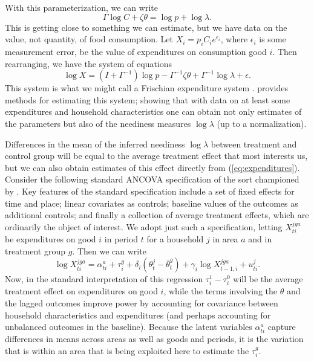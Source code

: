 \documentclass[12pt,letterpaper]{article}
\newcommand{\Eq}[1]{(\ref{eq:#1})}
\begin{document}
With this parameterization, we can write \[ \Gamma\log C + \zeta\theta
= \log p + \log\lambda.  \] This is getting close to something we can
estimate, but we have data on the value, not quantity, of food
consumption.  Let \(X_i=p_iC_ie^{\epsilon_i}\), where \(\epsilon_i\) is
some measurement error, be the value of expenditures on consumption
good \(i\).  Then rearranging, we have the system of equations
\begin{equation}
\label{eq:expenditures}
\log X  = (I + \Gamma^{-1})\log p - \Gamma^{-1}\zeta\theta + \Gamma^{-1}\log\lambda
+ \epsilon.
\end{equation}
This system is what we might call a Frischian expenditure system
\citep{browning-etal85}.  \cite{Ligon15} provides methods for
estimating this system; showing that with data on at least some
expenditures and household characteristics one can obtain not only
estimates of the parameters but also of the neediness measures
\(\log\lambda\) (up to a normalization).

Differences in the mean of the inferred neediness \(\log\lambda\) between
treatment and control group will be equal to the average treatment
effect that most interests us, but we can also obtain estimates of
this effect directly from \Eq{expenditures}.  Consider the following
standard ANCOVA specification of the sort championed by
\cite{Mckenzie2012}.  Key features of the standard specification
include a set of fixed effects for time and place; linear covariates
as controls; baseline values of the outcomes as additional controls;
and finally a collection of average treatment effects, which are
ordinarily the object of interest.  We adopt just such a
specification, letting \(X^{jga}_{ti}\) be expenditures on good \(i\) in
period \(t\) for a household \(j\) in area \(a\) and in treatment group \(g\).
Then we can write
\begin{equation}
\label{eq:ancova}
  \log X^{jga}_{ti} = \alpha^a_{ti} + \tau^g_i +  \delta_i(\theta^j_t - \bar\theta^g_t) + \gamma_i \log X^{jga}_{t-1,i} + u^j_{ti}.
\end{equation}
Now, in the standard interpretation of this regression \(\tau^1_i-\tau^0_i\)
will be the average treatment effect on expenditures on good \(i\), while the terms
involving the \(\theta\) and the lagged outcomes improve power by
accounting for covariance between household characteristics and
expenditures (and perhaps accounting for unbalanced outcomes in the
baseline).  Because the latent variables \(\alpha^a_{ti}\) capture
differences in means across areas as well as goods and periods, it is
the variation that is within an area that is being exploited here to
estimate the \(\tau^g_i\).
\end{document}
